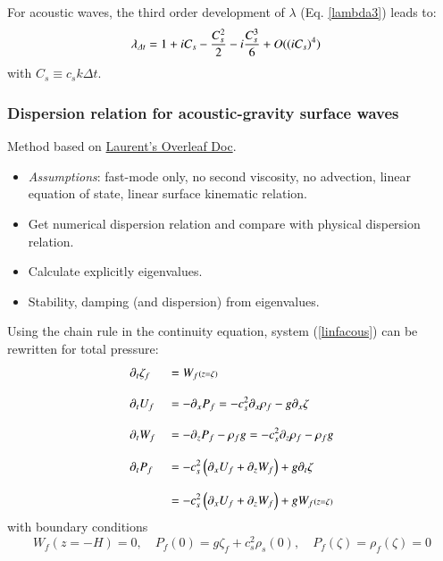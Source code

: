 \documentclass[a4paper,11pt]{article}
\begin{document}
  For acoustic waves, the third order development of $\lambda$ (Eq. \ref{lambda3}) leads
  to:  
  \begin{equation}
    \label{lambdadtacous}
    \begin{split}
      \displaystyle
      &\lambda_{\Delta t}=1+iC_s-\frac{C_s^2}{2}-i\frac{C_s^3}{6}+O((iC_s)^4)
    \end{split}
  \end{equation}
  with $C_s\equiv c_s k \Delta t$.

 \subsubsection{Dispersion relation for acoustic-gravity surface waves}

 Method based on \href{https://www.overleaf.com/11734032gfdqhstdsphc}{Laurent's Overleaf Doc}.
 \begin{itemize}[label=\textbullet,font=\tiny]
   \item \textit{Assumptions}: fast-mode only, no second viscosity, no advection, linear equation of state, linear surface kinematic relation.
   \item Get numerical dispersion relation and compare with physical dispersion relation.
   \item Calculate explicitly eigenvalues.
   \item Stability, damping (and dispersion) from eigenvalues.\\
 \end{itemize}
  
Using the chain rule in the continuity equation, system (\ref{linfacous}) can be rewritten for total pressure:
   \begin{equation}
   \begin{split}
      \displaystyle
      &\partial_t\zeta_f&&=W_f\scriptstyle(z=\zeta)\textstyle\\[3mm]
      &\partial_t U_f&&=-\partial_x P_f=-c_s^2\partial_x \rho_f-g\partial_x\zeta\\[3mm]
      &\partial_t W_f&&=-\partial_z P_f-\rho_f g=-c_s^2\partial_z \rho_f-\rho_f g\\[3mm]
      &\partial_t P_f &&=-c_s^2 \left( \partial_x U_f+\partial_z W_f \right)+g\partial_t \zeta\\[3mm]
      & &&=-c_s^2 \left( \partial_x U_f+\partial_z W_f \right)+gW_f\scriptstyle(z=\zeta)\textstyle
   \end{split}  
   \end{equation}
   \label{linfast}
   with boundary conditions
   \[
   W_f\scriptstyle(z=-H)\textstyle=0,\quad P_f(0) = g\zeta_f+c_s^2 \rho_s(0),\quad P_f(\zeta)=\rho_f(\zeta) =0 
   \]
\end{document}
